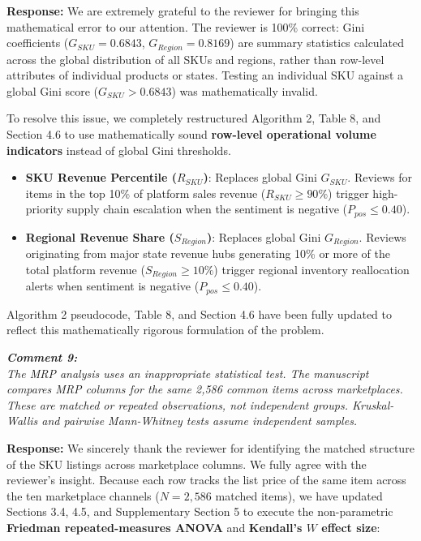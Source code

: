\documentclass[11pt]{article}
\newcommand{\comment}[1]{\vspace{12pt}\noindent\colorbox{gray!10}{\parbox{\dimexpr\textwidth-2\fboxsep\relax}{\color{commentcolor}\itshape #1}}\vspace{6pt}}
\newcommand{\response}{\vspace{6pt}\noindent\textbf{Response: }}
\begin{document}
\response
We are extremely grateful to the reviewer for bringing this mathematical error to our attention. The reviewer is 100\% correct: Gini coefficients ($G_{SKU} = 0.6843$, $G_{Region} = 0.8169$) are summary statistics calculated across the global distribution of all SKUs and regions, rather than row-level attributes of individual products or states. Testing an individual SKU against a global Gini score ($G_{SKU} > 0.6843$) was mathematically invalid.

To resolve this issue, we completely restructured Algorithm 2, Table 8, and Section 4.6 to use mathematically sound \textbf{row-level operational volume indicators} instead of global Gini thresholds.

\begin{itemize}
    \item \textbf{SKU Revenue Percentile ($R_{SKU}$)}: Replaces global Gini $G_{SKU}$. Reviews for items in the top 10\% of platform sales revenue ($R_{SKU} \ge 90\%$) trigger high-priority supply chain escalation when the sentiment is negative ($P_{pos} \le 0.40$).
    \item \textbf{Regional Revenue Share ($S_{Region}$)}: Replaces global Gini $G_{Region}$. Reviews originating from major state revenue hubs generating 10\% or more of the total platform revenue ($S_{Region} \ge 10\%$) trigger regional inventory reallocation alerts when sentiment is negative ($P_{pos} \le 0.40$).
\end{itemize}

Algorithm 2 pseudocode, Table 8, and Section 4.6 have been fully updated to reflect this mathematically rigorous formulation of the problem.

\comment{\textbf{Comment 9:} \\
The MRP analysis uses an inappropriate statistical test. The manuscript compares MRP columns for the same 2,586 common items across marketplaces. These are matched or repeated observations, not independent groups. Kruskal-Wallis and pairwise Mann-Whitney tests assume independent samples.}

\response
We sincerely thank the reviewer for identifying the matched structure of the SKU listings across marketplace columns. We fully agree with the reviewer's insight. Because each row tracks the list price of the same item across the ten marketplace channels ($N = 2,586$ matched items), we have updated Sections 3.4, 4.5, and Supplementary Section 5 to execute the non-parametric \textbf{Friedman repeated-measures ANOVA} and \textbf{Kendall's $W$ effect size}:
\end{document}
